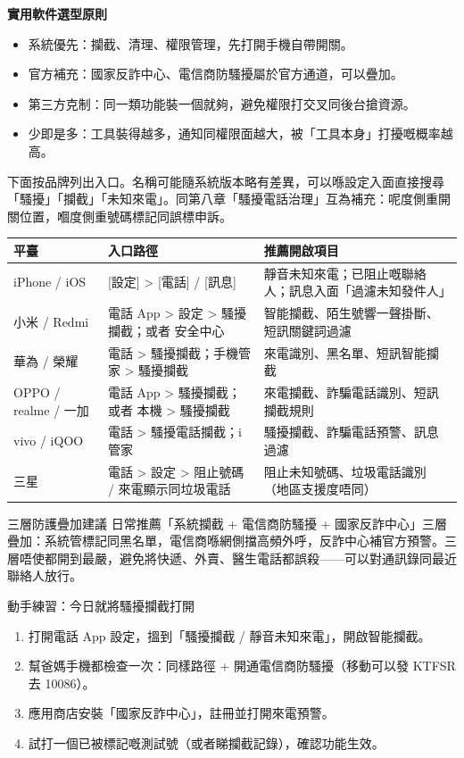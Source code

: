 \textbf{實用軟件選型原則}\par

\begin{itemize}
  \item 系統優先：攔截、清理、權限管理，先打開手機自帶開關。
  \item 官方補充：國家反詐中心、電信商防騷擾屬於官方通道，可以疊加。
  \item 第三方克制：同一類功能裝一個就夠，避免權限打交叉同後台搶資源。
  \item 少即是多：工具裝得越多，通知同權限面越大，被「工具本身」打擾嘅概率越高。
\end{itemize}


下面按品牌列出入口。名稱可能隨系統版本略有差異，可以喺設定入面直接搜尋「騷擾」「攔截」「未知來電」。同第八章「騷擾電話治理」互為補充：呢度側重開關位置，嗰度側重號碼標記同誤標申訴。

\begin{center}
\begin{tabularx}{\linewidth}{|X|X|X|}
\hline
\textbf{平臺} & \textbf{入口路徑} & \textbf{推薦開啟項目} \tabularnewline
\hline
iPhone / iOS & {}[設定] > [電話] / [訊息] & 靜音未知來電；已阻止嘅聯絡人；訊息入面「過濾未知發件人」 \tabularnewline
小米 / Redmi & 電話 App > 設定 > 騷擾攔截；或者 安全中心 & 智能攔截、陌生號響一聲掛斷、短訊關鍵詞過濾 \tabularnewline
華為 / 榮耀 & 電話 > 騷擾攔截；手機管家 > 騷擾攔截 & 來電識別、黑名單、短訊智能攔截 \tabularnewline
OPPO / realme / 一加 & 電話 App > 騷擾攔截；或者 本機 > 騷擾攔截 & 來電攔截、詐騙電話識別、短訊攔截規則 \tabularnewline
vivo / iQOO & 電話 > 騷擾電話攔截；i 管家 & 騷擾攔截、詐騙電話預警、訊息過濾 \tabularnewline
三星 & 電話 > 設定 > 阻止號碼 / 來電顯示同垃圾電話 & 阻止未知號碼、垃圾電話識別（地區支援度唔同） \tabularnewline
\hline
\end{tabularx}
\end{center}

\begin{tcbinfo}{三層防護疊加建議}
日常推薦「系統攔截 + 電信商防騷擾 + 國家反詐中心」三層疊加：系統管標記同黑名單，電信商喺網側擋高頻外呼，反詐中心補官方預警。三層唔使都開到最嚴，避免將快遞、外賣、醫生電話都誤殺——可以對通訊錄同最近聯絡人放行。

\end{tcbinfo}

\begin{tcbpractice}{動手練習：今日就將騷擾攔截打開}
\begin{enumerate}
  \item 打開電話 App 設定，搵到「騷擾攔截 / 靜音未知來電」，開啟智能攔截。
  \item 幫爸媽手機都檢查一次：同樣路徑 + 開通電信商防騷擾（移動可以發 KTFSR 去 10086）。
  \item 應用商店安裝「國家反詐中心」，註冊並打開來電預警。
  \item 試打一個已被標記嘅測試號（或者睇攔截記錄），確認功能生效。
\end{enumerate}

\end{tcbpractice}

